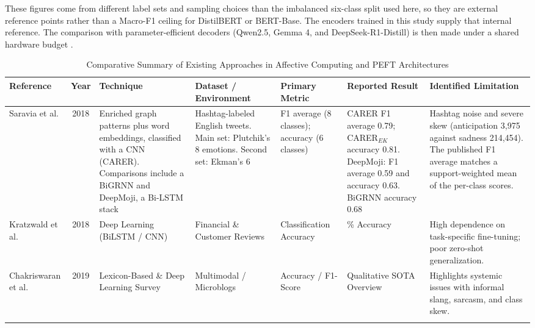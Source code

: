 \documentclass[conference]{IEEEtran}
\begin{document}
These figures come from different label sets and sampling choices than the imbalanced six-class split used here, so they are external reference points rather than a Macro-F1 ceiling for DistilBERT or BERT-Base. The encoders trained in this study supply that internal reference. The comparison with parameter-efficient decoders (Qwen2.5, Gemma 4, and DeepSeek-R1-Distill) is then made under a shared hardware budget \cite{nwaiwu2025peft, mohammed2026deepfake}.

\begin{table}[t]
\centering
\caption{Comparative Summary of Existing Approaches in Affective Computing and PEFT Architectures}
\label{tab:literature_comparison}
\scriptsize
\setlength{\tabcolsep}{4pt} %
\begin{tabularx}{\textwidth}{@{} >{\hsize=0.85\hsize}X c >{\hsize=1.05\hsize}X >{\hsize=1.0\hsize}X >{\hsize=0.85\hsize}X >{\hsize=1.05\hsize}X >{\hsize=1.2\hsize}X @{}}
\toprule
\textbf{Reference} & \textbf{Year} & \textbf{Technique} & \textbf{Dataset / Environment} & \textbf{Primary Metric} & \textbf{Reported Result} & \textbf{Identified Limitation} \\
\midrule

Saravia et al. \cite{saravia2018carer} & 2018 & Enriched graph patterns plus word embeddings, classified with a CNN (CARER). Comparisons include a BiGRNN and DeepMoji, a Bi-LSTM stack & Hashtag-labeled English tweets. Main set: Plutchik's 8 emotions. Second set: Ekman's 6 & F1 average (8 classes); accuracy (6 classes) & CARER F1 average 0.79; CARER$_{EK}$ accuracy 0.81. DeepMoji: F1 average 0.59 and accuracy 0.63. BiGRNN accuracy 0.68 & Hashtag noise and severe skew (anticipation 3,975 against sadness 214,454). The published F1 average matches a support-weighted mean of the per-class scores. \\
\addlinespace

Kratzwald et al. \cite{kratzwald2018deep} & 2018 & Deep Learning (BiLSTM / CNN) & Financial \& Customer Reviews & Classification Accuracy & 82.4\% Accuracy & High dependence on task-specific fine-tuning; poor zero-shot generalization. \\
\addlinespace

Chakriswaran et al. \cite{chakriswaran2019emotion} & 2019 & Lexicon-Based \& Deep Learning Survey & Multimodal / Microblogs & Accuracy / F1-Score & Qualitative SOTA Overview & Highlights systemic issues with informal slang, sarcasm, and class skew. \\
\addlinespace


\end{tabularx}
\end{table}
\end{document}
